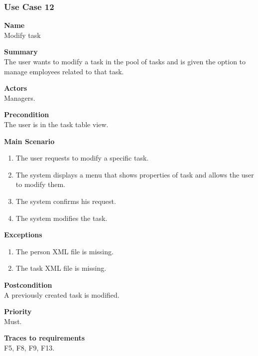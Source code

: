 \documentclass[12pt]{article}
\begin{document}
\subsubsection{Use Case 12} \label{uc:12}

\noindent
{\bf Name}\\
Modify task

\noindent
{\bf Summary}\\
The user wants to modify a task in the pool of tasks and is given the option to manage employees related to that task.

\noindent
{\bf Actors}\\
Managers.

\noindent
{\bf Precondition}\\
The user is in the task table view.

\noindent
{\bf Main Scenario}\\
\vspace*{-0.35in}
\begin{enumerate}
\item The user requests to modify a specific task.
\vspace*{-0.1in}
\item The system displays a menu that shows properties of task and allows the user to modify them.
\vspace*{-0.1in}
\item The system confirms his request.
\vspace*{-0.1in}
\item The system modifies the task.
\end{enumerate}
\vspace*{-0.1in}

\noindent
{\bf Exceptions}\\
\vspace*{-0.35in}
\begin{enumerate}
\item The person XML file is missing.
\vspace*{-0.1in}
\item The task XML file is missing.
\end{enumerate}
\vspace*{-0.1in}

\noindent
{\bf Postcondition}\\
A previously created task is modified.

\noindent
{\bf Priority}\\
Must.

\noindent
{\bf Traces to requirements}\\
F5, F8, F9, F13.
\end{document}
